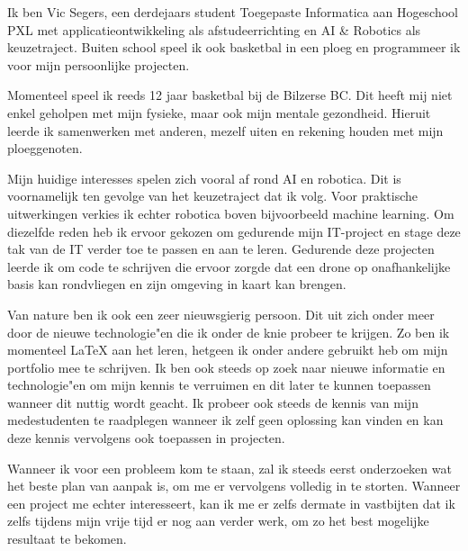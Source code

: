 

Ik ben Vic Segers, een derdejaars student Toegepaste Informatica aan Hogeschool PXL met applicatieontwikkeling als afstudeerrichting en AI \& Robotics als keuzetraject. Buiten school speel ik ook basketbal in een ploeg en programmeer ik voor mijn persoonlijke projecten.

Momenteel speel ik reeds 12 jaar basketbal bij de Bilzerse BC. Dit heeft mij niet enkel geholpen met mijn fysieke, maar ook mijn mentale gezondheid. Hieruit leerde ik samenwerken met anderen, mezelf uiten en rekening houden met mijn ploeggenoten.

Mijn huidige interesses spelen zich vooral af rond AI en robotica. Dit is voornamelijk ten gevolge van het keuzetraject dat ik volg. Voor praktische uitwerkingen verkies ik echter robotica boven bijvoorbeeld machine learning. Om diezelfde reden heb ik ervoor gekozen om gedurende mijn IT\hyp{}project en stage deze tak van de IT verder toe te passen en aan te leren. Gedurende deze projecten leerde ik om code te schrijven die ervoor zorgde dat een drone op onafhankelijke basis kan rondvliegen en zijn omgeving in kaart kan brengen.

Van nature ben ik ook een zeer nieuwsgierig persoon. Dit uit zich onder meer door de nieuwe technologie"en die ik onder de knie probeer te krijgen. Zo ben ik momenteel \LaTeX{} aan het leren, hetgeen ik onder andere gebruikt heb om mijn portfolio mee te schrijven. Ik ben ook steeds op zoek naar nieuwe informatie en technologie"en om mijn kennis te verruimen en dit later te kunnen toepassen wanneer dit nuttig wordt geacht. Ik probeer ook steeds de kennis van mijn medestudenten te raadplegen wanneer ik zelf geen oplossing kan vinden en kan deze kennis vervolgens ook toepassen in projecten.

Wanneer ik voor een probleem kom te staan, zal ik steeds eerst onderzoeken wat het beste plan van aanpak is, om me er vervolgens volledig in te storten. Wanneer een project me echter interesseert, kan ik me er zelfs dermate in vastbijten dat ik zelfs tijdens mijn vrije tijd er nog aan verder werk, om zo het best mogelijke resultaat te bekomen.

